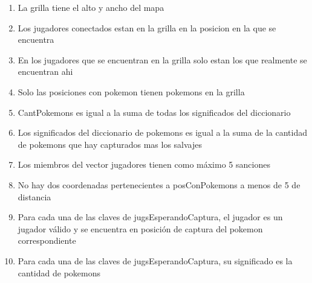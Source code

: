 \begin{Representacion}
\begin{enumerate}
		\item La grilla tiene el alto y ancho del mapa 

		\item Los jugadores conectados estan en la grilla en la posicion en la que se encuentra 

		\item En los jugadores que se encuentran en la grilla solo estan los que realmente se encuentran ahi 

		\item Solo las posiciones con pokemon tienen pokemons en la grilla

		\item CantPokemons es igual a la suma de todas los significados del diccionario 

		\item Los significados del diccionario de pokemons es igual a la suma de la cantidad de pokemons que hay capturados mas los salvajes 

		\item Los miembros del vector jugadores tienen como máximo 5 sanciones 

		\item No hay dos coordenadas pertenecientes a posConPokemons a menos de 5 de distancia

		\item Para cada una de las claves de jugsEsperandoCaptura, el jugador es un jugador válido y se encuentra en posición de captura del pokemon correspondiente

		\item Para cada una de las claves de jugsEsperandoCaptura, su significado es la cantidad de pokemons


	\end{enumerate}




\end{Representacion}
